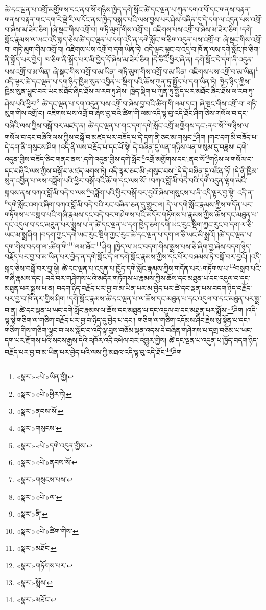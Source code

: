 ཚེ་དང་ལྡན་པ་འགྲོ་མགྱོགས་དང་ནབ་སོ་གཉིས་ཁྱེད་དགེ་སློང་ཚེ་དང་ལྡན་པ་ཀུན་དགའ་བོ་དང་གནས་བརྟན་གནས་བརྟན་གང་དག་རེ་ལྡེ་རི་ལ་དོང་ནས་ཁྱེད་བསྐྲད་པའི་ལས་བྱས་པར་ཤེས་བཞིན་དུ་དེ་དག་ལ་འདུན་པས་འགྲོ་བ་ཞེས་མ་ཟེར་ཅིག །ཞེ་སྡང་གིས་འགྲོ་བ། གཏི་མུག་གིས་འགྲོ་བ། འཇིགས་པས་འགྲོ་བ་ཞེས་མ་ཟེར་ཅིག །དགེ་སློང་རྣམས་ལ་ཡང་འདི་སྐད་ཅེས་ཚེ་དང་ལྡན་པ་དག་འདི་ན་དགེ་སློང་ཁ་ཅིག་འདུན་པས་འགྲོ་བ། ཞེ་སྡང་གིས་འགྲོ་བ། གཏི་མུག་གིས་འགྲོ་བ། འཇིགས་པས་འགྲོ་བ་དག་ཡིན་ཏེ། འདི་ལྟར་ལྟུང་བ་འདྲ་བ་ཁོ་ན་ལས་དགེ་སློང་ཁ་ཅིག་ནི་སྐྲོད་པར་བྱེད། ཁ་ཅིག་ནི་སྐྲོད་པར་མི་བྱེད་དོ་ཞེས་མ་ཟེར་ཅིག །དེ་ཅིའི་ཕྱིར་ཞེ་ན། དགེ་སློང་དེ་དག་ནི་འདུན་པས་འགྲོ་བ་མ་ཡིན། ཞེ་སྡང་གིས་འགྲོ་བ་མ་ཡིན། གཏི་མུག་གིས་འགྲོ་བ་མ་ཡིན། འཇིགས་པས་འགྲོ་བ་མ་ཡིན།\footnote{«སྣར་»«པེ་»ཡིན་གྱི།} འདི་ལྟར་ཚེ་དང་ལྡན་པ་དག་ཉིད་ཁྱིམ་སུན་འབྱིན་པ་སྡིག་པའི་ཆོས་ཀུན་ཏུ་སྤྱོད་པ་དག་ཡིན་ཏེ། ཁྱེད་ཉིད་ཀྱིས་ཁྱིམ་སུན་ཕྱུང་བར་ཡང་མཐོང་ཞིང་ཐོས་ལ་རབ་ཏུ་ཤེས། ཁྱེད་སྡིག་པ་ཀུན་ཏུ་སྤྱོད་པར་མཐོང་ཞིང་ཐོས་ལ་རབ་ཏུ་ཤེས་པའི་ཕྱིར།\footnote{«སྣར་»«པེ་»ཕྱིར་ཏེ།} ཚེ་དང་ལྡན་པ་དག་འདུན་པས་འགྲོ་བ་ཞེས་བྱ་བའི་ཚིག་གི་ལམ་དང་། ཞེ་སྡང་གིས་འགྲོ་བ། གཏི་མུག་གིས་འགྲོ་བ། འཇིགས་པས་འགྲོ་བ་ཞེས་བྱ་བའི་ཚིག་གི་ལམ་འདི་ལྟ་བུ་འདི་ཐོང་ཤིག་ཅེས་གསོལ་བ་དང་བཞིའི་ལས་ཀྱིས་བསྒོ་བར་མཛད་ན། ཚེ་དང་ལྡན་པ་གང་དག་དགེ་སློང་འགྲོ་མགྱོགས་དང་:ནབ་སོ་\footnote{«སྣར་»ནབས་སོ་}གཉིས་ལ་གསོལ་བ་དང་བཞིའི་ལས་ཀྱིས་བསྒོ་བ་མཛད་པར་བཟོད་པ་དེ་དག་ནི་ཅང་མ་གསུང་\footnote{«སྣར་»གསུངས་}ཤིག །གང་དག་མི་བཟོད་པ་དེ་དག་ནི་གསུངས་ཤིག །འདི་ནི་ལས་བརྗོད་པ་དང་པོ་སྟེ། དེ་བཞིན་དུ་ལན་གཉིས་ལན་གསུམ་དུ་བཟླས། དགེ་འདུན་གྱིས་བཟོད་ཅིང་གནང་ནས་:དགེ་འདུན་གྱིས་དགེ་སློང་\footnote{«སྣར་»«པེ་»དགེ་འདུན་གྱིས་}འགྲོ་མགྱོགས་དང་:ནབ་སོ་\footnote{«སྣར་»«པེ་»ནབས་སོ་}གཉིས་ལ་གསོལ་བ་དང་བཞིའི་ལས་ཀྱིས་བསྒོ་བ་མཛད་ལགས་ཏེ། འདི་ལྟར་ཅང་མི་:གསུང་བས་\footnote{«སྣར་»གསུངས་པས་}དེ་དེ་བཞིན་དུ་འཛིན་ཏོ། །དེ་ནི་ཁྱིམ་སུན་འབྱིན་པ་ལས་བཟློག་པའི་ཕྱིར་བསྒོ་བའི་ཆོ་ག་དང་ལས་སོ། །བཀའ་བློ་མི་བདེ་བའི་དགེ་འདུན་ལྷག་མའི་སྐབས་ནས་བཀའ་བློ་མི་བདེ་བ་ལས་\footnote{«སྣར་»«པེ་»ལ་}བཟློག་པའི་ཕྱིར་བསྒོ་བར་བྱའོ་ཞེས་གསུངས་པ་ནི་འདི་ལྟར་བྱ་སྟེ། འདི་ན་\footnote{«སྣར་»ནི་}དགེ་སློང་འགའ་ཞིག་བཀའ་བློ་མི་བདེ་བའི་རང་བཞིན་ཅན་དུ་གྱུར་ལ། དེ་ལ་དགེ་སློང་རྣམས་ཀྱིས་གདོན་པར་གཏོགས་པ་བསླབ་པའི་གཞི་རྣམས་དང་བདེ་བར་གཤེགས་པའི་མདོར་གཏོགས་པ་རྣམས་ཀྱིས་ཆོས་དང་མཐུན་པ་དང་འདུལ་བ་དང་མཐུན་པར་སྨྲས་པ་ན་ཚེ་དང་ལྡན་པ་དག་ཁྱེད་ཅག་དགེ་ཡང་རུང་སྡིག་ཀྱང་རུང་བ་དག་ལ་ཅི་ཡང་མ་སྨྲ་ཤིག །བདག་ཀྱང་དགེ་ཡང་རུང་སྡིག་ཀྱང་རུང་ཚེ་དང་ལྡན་པ་དག་ལ་ཅི་ཡང་མི་སྨྲའོ། །ཚེ་དང་ལྡན་པ་དག་གིས་བདག་ལ་:ཚིག་གི་\footnote{«སྣར་»«པེ་»ཚིག་གིས་}ལམ་ཐོང་\footnote{«སྣར་»མཐོང་}ཤིག །ཁྱེད་ལ་ཡང་བདག་གིས་སྨྲས་པས་ཅི་ཞིག་བྱ་ཞེས་བདག་ཉིད་བརྗོད་པར་བྱ་བ་མ་ཡིན་པར་བྱེད་ན་དགེ་སློང་དེ་ལ་དགེ་སློང་རྣམས་ཀྱིས་དང་པོར་བཞམས་ཏེ་བསྒོ་བར་བྱའོ། །འདི་སྐད་ཅེས་བསྒོ་བར་བྱ་སྟེ། ཚེ་དང་ལྡན་པ་འདུན་པ་ཁྱོད་དགེ་སློང་རྣམས་ཀྱིས་གདོན་པར་:གཏོགས་པ་\footnote{«སྣར་»གཏོགས་པར་}བསླབ་པའི་གཞི་རྣམས་དང་། བདེ་བར་གཤེགས་པའི་མདོར་གཏོགས་པ་རྣམས་ཀྱིས་ཆོས་དང་མཐུན་པ་དང་འདུལ་བ་དང་མཐུན་པར་སྨྲས་པ་ན། བདག་ཉིད་བརྗོད་པར་བྱ་བ་མ་ཡིན་པར་མ་བྱེད་པར་ཚེ་དང་ལྡན་པས་བདག་ཉིད་བརྗོད་པར་བྱ་བ་ཁོ་ནར་གྱིས་ཤིག །དགེ་སློང་རྣམས་ཚེ་དང་ལྡན་པ་ལ་ཆོས་དང་མཐུན་པ་དང་འདུལ་བ་དང་མཐུན་པར་སྨྲ་བ་ན། ཚེ་དང་ལྡན་པ་ཡང་དགེ་སློང་རྣམས་ལ་ཆོས་དང་མཐུན་པ་དང་འདུལ་བ་དང་མཐུན་པར་སྨྲོས་\footnote{«སྣར་»སྨོས་}ཤིག །འདི་ལྟ་སྟེ་གཅིག་ལ་གཅིག་བརྗོད་པར་བྱ་བ་ཉིད་དུ་བྱེད་པ་དང་། གཅིག་ལ་གཅིག་འདོམས་ཤིང་རྗེས་སུ་སྟོན་པ་དང་། གཅིག་གིས་གཅིག་ལྟུང་བ་ལས་སློང་བ་འདི་ལྟ་བུས་བཅོམ་ལྡན་འདས་དེ་བཞིན་གཤེགས་པ་དགྲ་བཅོམ་པ་ཡང་དག་པར་རྫོགས་པའི་སངས་རྒྱས་དེའི་འཁོར་འདི་འཕེལ་བར་འགྱུར་གྱིས། ཚེ་དང་ལྡན་པ་འདུན་པ་ཁྱོད་བདག་ཉིད་བརྗོད་པར་བྱ་བ་མ་ཡིན་པར་བྱེད་པའི་ལས་ཀྱི་མཐའ་འདི་ལྟ་བུ་འདི་ཐོང་\footnote{«སྣར་»མཐོང་}ཤིག 